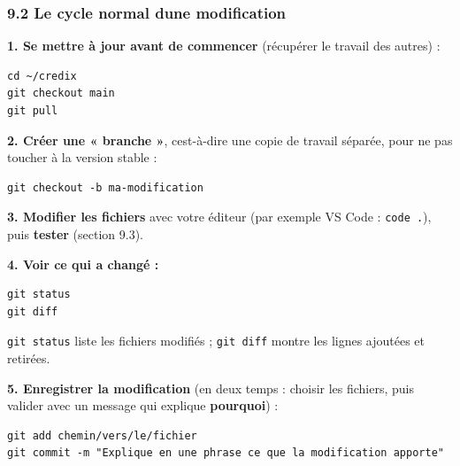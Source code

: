 \documentclass[
  french,
  11pt,
  a4paper,
]{article}
\begin{document}
\subsubsection{9.2 Le cycle normal d\textquotesingle une
modification}\label{92-le-cycle-normal-dune-modification}

\textbf{1. Se mettre à jour avant de commencer} (récupérer le travail
des autres) :

\begin{Verbatim}[breaklines=true,breakanywhere=true,fontsize=\small,frame=leftline,framerule=1.6pt,rulecolor=\color{credixblue},framesep=3mm,xleftmargin=2mm,xrightmargin=1mm]
cd ~/credix
git checkout main
git pull
\end{Verbatim}

\textbf{2. Créer une « branche »}, c\textquotesingle est-à-dire une
copie de travail séparée, pour ne pas toucher à la version stable :

\begin{Verbatim}[breaklines=true,breakanywhere=true,fontsize=\small,frame=leftline,framerule=1.6pt,rulecolor=\color{credixblue},framesep=3mm,xleftmargin=2mm,xrightmargin=1mm]
git checkout -b ma-modification
\end{Verbatim}

\textbf{3. Modifier les fichiers} avec votre éditeur (par exemple VS
Code : \texttt{code\ .}), puis \textbf{tester} (section 9.3).

\textbf{4. Voir ce qui a changé :}

\begin{Verbatim}[breaklines=true,breakanywhere=true,fontsize=\small,frame=leftline,framerule=1.6pt,rulecolor=\color{credixblue},framesep=3mm,xleftmargin=2mm,xrightmargin=1mm]
git status
git diff
\end{Verbatim}

\texttt{git\ status} liste les fichiers modifiés ; \texttt{git\ diff}
montre les lignes ajoutées et retirées.

\textbf{5. Enregistrer la modification} (en deux temps : choisir les
fichiers, puis valider avec un message qui explique \textbf{pourquoi}) :

\begin{Verbatim}[breaklines=true,breakanywhere=true,fontsize=\small,frame=leftline,framerule=1.6pt,rulecolor=\color{credixblue},framesep=3mm,xleftmargin=2mm,xrightmargin=1mm]
git add chemin/vers/le/fichier
git commit -m "Explique en une phrase ce que la modification apporte"
\end{Verbatim}
\end{document}

